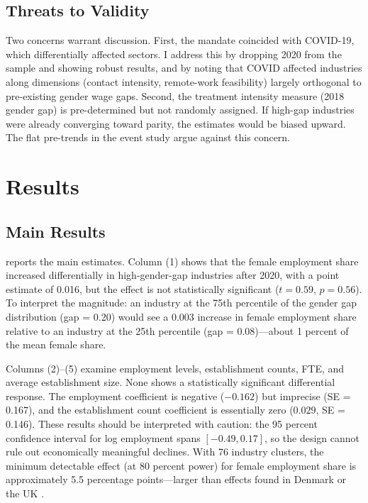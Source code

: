 \documentclass[12pt]{article}
\begin{document}
\subsection{Threats to Validity}

Two concerns warrant discussion. First, the mandate coincided with COVID-19, which differentially affected sectors. I address this by dropping 2020 from the sample and showing robust results, and by noting that COVID affected industries along dimensions (contact intensity, remote-work feasibility) largely orthogonal to pre-existing gender wage gaps. Second, the treatment intensity measure (2018 gender gap) is pre-determined but not randomly assigned. If high-gap industries were already converging toward parity, the estimates would be biased upward. The flat pre-trends in the event study argue against this concern.


\section{Results}

\subsection{Main Results}

 reports the main estimates. Column (1) shows that the female employment share increased differentially in high-gender-gap industries after 2020, with a point estimate of 0.016, but the effect is not statistically significant ($t = 0.59$, $p = 0.56$). To interpret the magnitude: an industry at the 75th percentile of the gender gap distribution (gap = 0.20) would see a 0.003 increase in female employment share relative to an industry at the 25th percentile (gap = 0.08)---about 1 percent of the mean female share.

Columns (2)--(5) examine employment levels, establishment counts, FTE, and average establishment size. None shows a statistically significant differential response. The employment coefficient is negative ($-0.162$) but imprecise (SE = 0.167), and the establishment count coefficient is essentially zero ($0.029$, SE = 0.146). These results should be interpreted with caution: the 95 percent confidence interval for log employment spans $[-0.49, 0.17]$, so the design cannot rule out economically meaningful declines. With 76 industry clusters, the minimum detectable effect (at 80 percent power) for female employment share is approximately 5.5 percentage points---larger than effects found in Denmark \citep{baker2023pay} or the UK \citep{duchini2020pay}.
\end{document}
